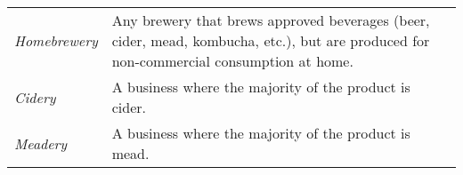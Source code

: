 \begin{tabular}{@{}ll@{}}
    \textit{Homebrewery} & Any brewery that brews approved beverages (beer, cider, mead, kombucha, etc.), but are produced for non-commercial consumption at home.                                                                                                                          \\
    \textit{Cidery}      & A business where the majority of the product is cider.                                                                                                                                                                                                           \\
    \textit{Meadery}     & A business where the majority of the product is mead.                                                                                                                                                                                                            \\ \bottomrule
    \end{tabular}